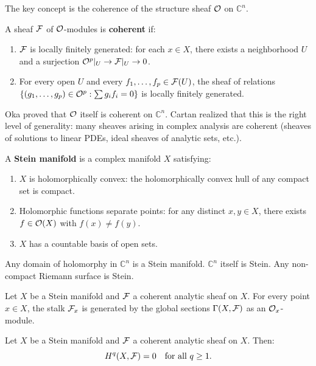 The key concept is the coherence of the structure sheaf $\mathcal{O}$ on $\mathbb{C}^n$.

\begin{definition}
A sheaf $\mathcal{F}$ of $\mathcal{O}$-modules is \textbf{coherent} if:
\begin{enumerate}
\item $\mathcal{F}$ is locally finitely generated: for each $x \in X$, there exists a neighborhood $U$ and a surjection $\mathcal{O}^p|_U \to \mathcal{F}|_U \to 0$.
\item For every open $U$ and every $f_1,\dots,f_p \in \mathcal{F}(U)$, the sheaf of relations $\{(g_1,\dots,g_p) \in \mathcal{O}^p : \sum g_i f_i = 0\}$ is locally finitely generated.
\end{enumerate}
\end{definition}

Oka proved that $\mathcal{O}$ itself is coherent on $\mathbb{C}^n$. Cartan realized that this is the right level of generality: many sheaves arising in complex analysis are coherent (sheaves of solutions to linear PDEs, ideal sheaves of analytic sets, etc.).

A \textbf{Stein manifold} is a complex manifold $X$ satisfying:
\begin{enumerate}
\item $X$ is holomorphically convex: the holomorphically convex hull of any compact set is compact.
\item Holomorphic functions separate points: for any distinct $x,y \in X$, there exists $f \in \mathcal{O}(X)$ with $f(x) \neq f(y)$.
\item $X$ has a countable basis of open sets.
\end{enumerate}

\begin{example}
Any domain of holomorphy in $\mathbb{C}^n$ is a Stein manifold. $\mathbb{C}^n$ itself is Stein. Any non-compact Riemann surface is Stein.
\end{example}

\begin{theorem}
Let $X$ be a Stein manifold and $\mathcal{F}$ a coherent analytic sheaf on $X$. For every point $x \in X$, the stalk $\mathcal{F}_x$ is generated by the global sections $\Gamma(X, \mathcal{F})$ as an $\mathcal{O}_x$-module.
\end{theorem}

\begin{theorem}
Let $X$ be a Stein manifold and $\mathcal{F}$ a coherent analytic sheaf on $X$. Then:
\[
H^q(X, \mathcal{F}) = 0 \quad \text{for all } q \geq 1.
\]
\end{theorem}

